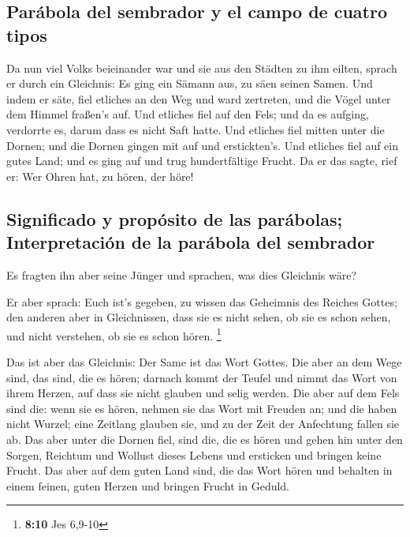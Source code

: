 \hypertarget{paruxe1bola-del-sembrador-y-el-campo-de-cuatro-tipos}{%
\subsection{Parábola del sembrador y el campo de cuatro
tipos}\label{paruxe1bola-del-sembrador-y-el-campo-de-cuatro-tipos}}

 Da nun viel Volks beieinander war und sie aus den Städten
zu ihm eilten, sprach er durch ein Gleichnis:  Es ging ein
Sämann aus, zu säen seinen Samen. Und indem er säte, fiel etliches an
den Weg und ward zertreten, und die Vögel unter dem Himmel fraßen's auf.
 Und etliches fiel auf den Fels; und da es aufging,
verdorrte es, darum dass es nicht Saft hatte.  Und
etliches fiel mitten unter die Dornen; und die Dornen gingen mit auf und
erstickten's.  Und etliches fiel auf ein gutes Land; und
es ging auf und trug hundertfältige Frucht. Da er das sagte, rief er:
Wer Ohren hat, zu hören, der höre!

\hypertarget{significado-y-propuxf3sito-de-las-paruxe1bolas-interpretaciuxf3n-de-la-paruxe1bola-del-sembrador}{%
\subsection{Significado y propósito de las parábolas; Interpretación de
la parábola del
sembrador}\label{significado-y-propuxf3sito-de-las-paruxe1bolas-interpretaciuxf3n-de-la-paruxe1bola-del-sembrador}}

 Es fragten ihn aber seine Jünger und sprachen, was dies
Gleichnis wäre?

 Er aber sprach: Euch ist's gegeben, zu wissen das
Geheimnis des Reiches Gottes; den anderen aber in Gleichnissen, dass sie
es nicht sehen, ob sie es schon sehen, und nicht verstehen, ob sie es
schon hören. \footnote{\textbf{8:10} Jes 6,9-10}

 Das ist aber das Gleichnis: Der Same ist das Wort
Gottes.  Die aber an dem Wege sind, das sind, die es
hören; darnach kommt der Teufel und nimmt das Wort von ihrem Herzen, auf
dass sie nicht glauben und selig werden.  Die aber auf
dem Fels sind die: wenn sie es hören, nehmen sie das Wort mit Freuden
an; und die haben nicht Wurzel; eine Zeitlang glauben sie, und zu der
Zeit der Anfechtung fallen sie ab.  Das aber unter die
Dornen fiel, sind die, die es hören und gehen hin unter den Sorgen,
Reichtum und Wollust dieses Lebens und ersticken und bringen keine
Frucht.  Das aber auf dem guten Land sind, die das Wort
hören und behalten in einem feinen, guten Herzen und bringen Frucht in
Geduld.


